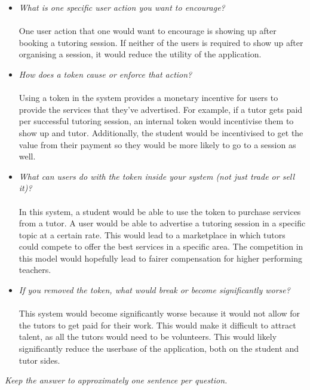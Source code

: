 \documentclass{article}
\theoremstyle{definition}
\begin{document}
\begin{itemize}
    \item \textit{What is one specific user action you want to encourage?}
            \\
            \\
            \noindent
            One user action that one would want to encourage is showing up after booking a tutoring session.
            If neither of the users is required to show up after organising a session, it would reduce the utility of the application.

    \item \textit{How does a token cause or enforce that action?}
            \\
            \\
            \noindent
            Using a token in the system provides a monetary incentive for users to provide the
            services that they've advertised. For example, if a tutor gets paid per successful 
            tutoring session, an internal token would incentivise them to show up and tutor.
            Additionally, the student would be incentivised to get the value from their payment
            so they would be more likely to go to a session as well.

    \item \textit{What can users do with the token inside your system (not just trade or sell it)?}
            \\
            \\
            \noindent
            In this system, a student would be able to use the token to purchase services from a tutor.
            A user would be able to advertise a tutoring session in a specific topic at a certain rate.
            This would lead to a marketplace in which tutors could compete to offer the best services in a specific area.
            The competition in this model would hopefully lead to fairer compensation for higher performing teachers.

    \item \textit{If you removed the token, what would break or become significantly worse?}
            \\
            \\
            \noindent
            This system would become significantly worse because it would not allow for the tutors to get paid for 
            their work. This would make it difficult to attract talent, as all the tutors would need to be volunteers.
            This would likely significantly reduce the userbase of the application, both on the student and tutor sides.
            
\end{itemize}
\textit{Keep the answer to approximately one sentence per question.}
\end{document}
